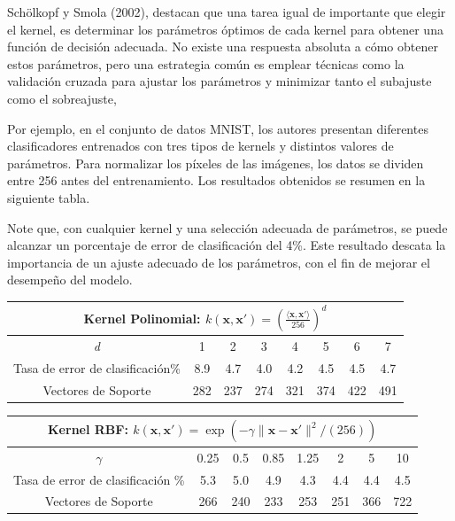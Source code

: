 \documentclass[letterpaper,12pt,oneside]{book}
\begin{document}
{{{{Sch\"olkopf y Smola (2002), destacan que una tarea igual de importante que elegir el kernel, es determinar los parámetros óptimos de cada kernel para obtener una función de decisión adecuada. No existe una respuesta absoluta a cómo obtener estos parámetros, pero una estrategia común es emplear técnicas como la validación cruzada para ajustar los parámetros y minimizar tanto el subajuste como el sobreajuste, 

Por ejemplo, en el conjunto de datos MNIST, los autores presentan diferentes clasificadores entrenados con tres tipos de kernels y distintos valores de parámetros. Para normalizar los píxeles de las imágenes, los datos se dividen entre 256 antes del entrenamiento. Los resultados obtenidos se resumen en la siguiente tabla.


Note que, con cualquier kernel y una selección adecuada de parámetros, se puede alcanzar un porcentaje de error de clasificación del 4\%. Este resultado descata la importancia de un ajuste adecuado de los parámetros, con el fin de mejorar el desempeño del modelo.

\begin{table}[h]
    \centering
    \renewcommand{\arraystretch}{1.2}
    \setlength{\tabcolsep}{10pt}
    \begin{tabular}{c|ccccccc}
        \multicolumn{8}{c}{\textbf{Kernel Polinomial:} \( k(\mathbf{x}, \mathbf{x}') = \left( \frac{\langle \mathbf{x}, \mathbf{x}' \rangle}{256} \right)^d \)} \\ \hline
        \textit{d} & 1 & 2 & 3 & 4 & 5 & 6 & 7 \\ \hline
        Tasa de error de clasificación\% & 8.9 & 4.7 & 4.0 & 4.2 & 4.5 & 4.5 & 4.7 \\
       Vectores de Soporte & 282 & 237 & 274 & 321 & 374 & 422 & 491 \\
    \end{tabular}
\end{table}

\begin{table}[h]
    \centering
    \renewcommand{\arraystretch}{1.2}
    \setlength{\tabcolsep}{10pt}
    \begin{tabular}{c|ccccccc}
        \multicolumn{8}{c}{\textbf{Kernel RBF:} \( k(\mathbf{x}, \mathbf{x}') = \exp \left( - \gamma \| \mathbf{x} - \mathbf{x}' \|^2 / (256) \right) \)} \\ \hline
        \textit{ $\gamma$ } & 0.25 & 0.5 & 0.85 & 1.25 & 2 & 5 & 10 \\ \hline
        Tasa de error de clasificación \% & 5.3 & 5.0 & 4.9 & 4.3 & 4.4 & 4.4 & 4.5 \\
        Vectores de Soporte & 266 & 240 & 233 & 253 & 251 & 366 & 722 \\
    \end{tabular}
\end{table}

}}}}
\end{document}
